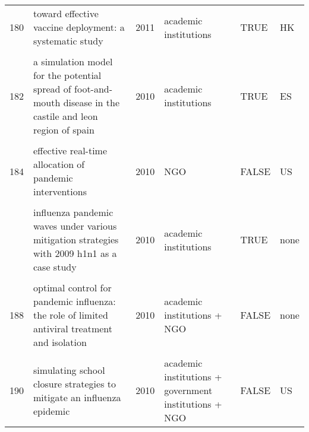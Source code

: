 \documentclass[
]{article}
\begin{document}
\begin{landscape}
\begin{longtable}{l>{\raggedright\arraybackslash}p{4cm}l>{\raggedright\arraybackslash}p{3.5cm}l>{\raggedright\arraybackslash}p{1.5cm}}
180 & toward effective vaccine deployment: a systematic study & 2011 & academic institutions & TRUE & HK\\
\addlinespace
\cellcolor{gray!6}{181} & \cellcolor{gray!6}{vaccination against 2009 pandemic h1n1 in a population dynamical model of vancouver, canada: timing is everything} & \cellcolor{gray!6}{2011} & \cellcolor{gray!6}{academic institutions + government institutions + NGO} & \cellcolor{gray!6}{FALSE} & \cellcolor{gray!6}{CA}\\
182 & a simulation model for the potential spread of foot-and-mouth disease in the castile and leon region of spain & 2010 & academic institutions & TRUE & ES\\
\cellcolor{gray!6}{183} & \cellcolor{gray!6}{community-based measures for mitigating the 2009 h1n1 pandemic in china} & \cellcolor{gray!6}{2010} & \cellcolor{gray!6}{academic institutions} & \cellcolor{gray!6}{TRUE} & \cellcolor{gray!6}{CN}\\
184 & effective real-time allocation of pandemic interventions & 2010 & NGO & FALSE & US\\
\cellcolor{gray!6}{185} & \cellcolor{gray!6}{efficient mitigation strategies for epidemics in rural regions} & \cellcolor{gray!6}{2010} & \cellcolor{gray!6}{academic institutions} & \cellcolor{gray!6}{TRUE} & \cellcolor{gray!6}{US}\\
\addlinespace
186 & influenza pandemic waves under various mitigation strategies with 2009 h1n1 as a case study & 2010 & academic institutions & TRUE & none\\
\cellcolor{gray!6}{187} & \cellcolor{gray!6}{is a mass immunization program for pandemic (h1n1) 2009 good value for money? early evidence from the canadian experience} & \cellcolor{gray!6}{2010} & \cellcolor{gray!6}{academic institutions + government institutions + NGO} & \cellcolor{gray!6}{FALSE} & \cellcolor{gray!6}{CA}\\
188 & optimal control for pandemic influenza: the role of limited antiviral treatment and isolation & 2010 & academic institutions + NGO & FALSE & none\\
\cellcolor{gray!6}{189} & \cellcolor{gray!6}{optimizing vaccine allocation at different points in time during an epidemic} & \cellcolor{gray!6}{2010} & \cellcolor{gray!6}{academic institutions + government institutions} & \cellcolor{gray!6}{FALSE} & \cellcolor{gray!6}{none}\\
190 & simulating school closure strategies to mitigate an influenza epidemic & 2010 & academic institutions + government institutions + NGO & FALSE & US\\

\end{longtable}
\end{landscape}
\end{document}
